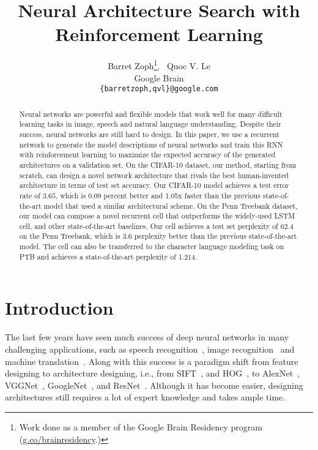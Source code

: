 \documentclass{article} \usepackage{iclr2017_conference,times}
\title{Neural Architecture Search with\\Reinforcement Learning}
\author{Barret Zoph\thanks{Work done as a member of the Google Brain Residency program (\url{g.co/brainresidency}.)}, ~Quoc V. Le \\
Google Brain \\
\texttt{\{barretzoph,qvl\}@google.com} \\
}
\begin{document}
\maketitle

\begin{abstract}
Neural networks are powerful and flexible models that work well for many difficult learning tasks in image, speech and natural language understanding. Despite their success, neural networks are still hard to design.
In this paper, we
use a recurrent network to generate the model descriptions of neural networks and train this RNN with reinforcement learning to maximize the expected accuracy of the generated architectures on a validation set. 
On the CIFAR-10 dataset, our method, starting from scratch, can design a novel network architecture that rivals the best human-invented architecture in terms of test set accuracy. Our CIFAR-10 model achieves a test error rate of $3.65$, which is $0.09$ percent better and 1.05x faster than the previous state-of-the-art model that used a similar architectural scheme. On the Penn Treebank dataset, our model can compose a novel recurrent cell that outperforms the widely-used LSTM cell, and other state-of-the-art baselines.  Our cell achieves a test set perplexity of 62.4 on the Penn Treebank, which is 3.6 perplexity better than the previous state-of-the-art model. The cell can also be transferred to the character language modeling task on PTB and achieves a state-of-the-art perplexity of 1.214.




\end{abstract}

\section{Introduction}
The last few years have seen much success of deep neural networks in many challenging applications, such as speech recognition~\citep{hinton2012deep}, image recognition~\citep{lecun1998gradient,krizhevsky2012imagenet} and machine translation~\citep{sutskever2014sequence,bahdanau2014neural,wu2016google}. Along with this success is a paradigm shift from feature designing to architecture designing, i.e., from SIFT~\citep{lowe1999object}, and HOG~\citep{dalal2005histograms}, to AlexNet~\citep{krizhevsky2012imagenet}, VGGNet~\citep{simonyan2014very}, GoogleNet~\citep{szegedy2015going}, and ResNet~\citep{he2015deep}. Although it has become easier, designing architectures still requires a lot of expert knowledge and takes ample time. 
\end{document}
